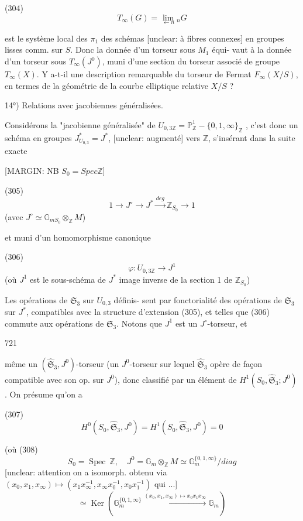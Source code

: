 (304) $$T_\infty(G) = \lim_{\leftarrow n} {}_n G$$

est le système local des $\pi_1$ des schémas
[unclear: à fibres connexes] en groupes lisses comm. sur $S$. Donc
la donnée d'un torseur sous $M_1$ équi-
vaut à la donnée d'un torseur sous
$T_\infty(J^0)$, muni d'une section du
torseur associé de groupe $T_\infty(X)$.
Y a-t-il une description remarquable du
torseur de Fermat $F_\infty(X/S)$, en termes
de la géométrie de la courbe elliptique
relative $X/S$ ?

\newpage


14°) Relations avec jacobiennes généralisées.

Considérons la "jacobienne généralisée" de
$U_{0,3 \mathbb{Z}} = \mathbb{P}^1_{\mathbb{Z}} - \{0,1,\infty\}_{\mathbb{Z}}$ , c'est donc un
schéma en groupes $J^*_{U_{0,3}} = J^*$, [unclear: augmenté]
vers $\mathbb{Z}$, s'insérant dans la suite
exacte

[MARGIN: NB $S_0 = Spec \mathbb{Z}$]

(305) $$1 \longrightarrow J^\circ \longrightarrow J^* \xrightarrow{deg} \mathbb{Z}_{S_0} \longrightarrow 1$$
(avec $J^\circ \simeq \mathbb{G}_{mS_0} \otimes_{\mathbb{Z}} M$)

et muni d'un homomorphisme
canonique

(306) $$\varphi : U_{0,3 \mathbb{Z}} \longrightarrow J^1$$
(où $J^1$ est le sous-schéma de $J^*$ image inverse de la section 1 de $\mathbb{Z}_{S_0}$)

Les opérations de $\mathfrak{S}_3$ sur $U_{0,3}$ définis-
sent par fonctorialité des opérations de
$\mathfrak{S}_3$ sur $J^*$, compatibles avec la structure
d'extension (305), et telles que
(306) commute aux opérations de $\mathfrak{S}_3$.
Notons que $J^1$ est un $J^\circ$-torseur, et

\newpage


721

même un $(\widehat{\mathfrak{S}}_3, J^0)$-torseur (un $J^0$-torseur sur lequel $\widehat{\mathfrak{S}}_3$ opère de façon compatible avec son op. sur $J^0$), donc classifié par un élément de $H^1(S_0, \widehat{\mathfrak{S}}_3; J^0)$. On présume qu'on a

(307) $$H^0(S_0, \widehat{\mathfrak{S}}_3, J^0) = H^1(S_0, \widehat{\mathfrak{S}}_3, J^0) = 0$$

(où
(308) $$S_0 = \operatorname{Spec}\ \mathbb{Z}, \quad J^0 = \mathbb{G}_m \otimes_{\mathbb{Z}} M \simeq \mathbb{G}_m^{\{0,1,\infty\}} / diag$$
[unclear: attention on a isomorph. obtenu via $(x_0,x_1,x_\infty) \mapsto (x_1 x_\infty^{-1}, x_\infty x_0^{-1}, x_0 x_1^{-1})$ qui ...]
$$\simeq \operatorname{Ker}(\mathbb{G}_m^{\{0,1,\infty\}} \xrightarrow{(x_0, x_1, x_\infty) \mapsto x_0 x_1 x_\infty} \mathbb{G}_m)$$

